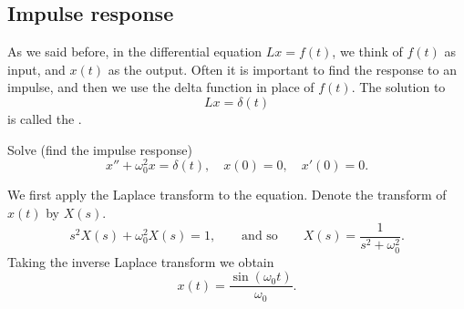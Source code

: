 \subsection{Impulse response}

As we said before, in the differential equation
$L x = f(t)$,
we think of $f(t)$ as input, and $x(t)$ as the output.  Often it is important
to find the response to an impulse, and then we use
the delta function in place of $f(t)$.
The solution to
\begin{equation*}
L x = \delta(t)
\end{equation*}
is called the
\emph{}.

\begin{example}
Solve (find the impulse response)
\begin{equation} \label{eq:lteximpulseresp}
x'' + \omega_0^2 x = \delta(t) , \quad x(0) = 0, \quad x'(0) = 0 .
\end{equation}

We first apply the Laplace transform to the equation.  Denote
the transform of $x(t)$ by $X(s)$.
\begin{equation*}
s^2 X(s) + \omega_0^2 X(s) = 1 ,
\qquad \text{and so} \qquad
X(s) = \frac{1}{s^2+ \omega_0^2} .
\end{equation*}
Taking the inverse Laplace transform we obtain
\begin{equation*}
x(t) = 
\frac{\sin (\omega_0 t)}{\omega_0} .
\end{equation*}
\end{example}

